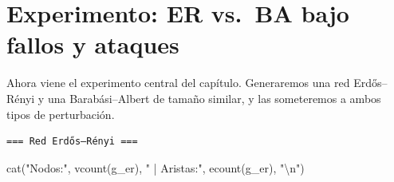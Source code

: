 \documentclass[
  letterpaper,
  DIV=11,
  numbers=noendperiod]{scrreprt}
\newenvironment{Shaded}{\begin{snugshade}}{\end{snugshade}}
\newcommand{\AttributeTok}[1]{\textcolor[rgb]{0.40,0.45,0.13}{#1}}
\newcommand{\CommentTok}[1]{\textcolor[rgb]{0.37,0.37,0.37}{#1}}
\newcommand{\ConstantTok}[1]{\textcolor[rgb]{0.56,0.35,0.01}{#1}}
\newcommand{\DecValTok}[1]{\textcolor[rgb]{0.68,0.00,0.00}{#1}}
\newcommand{\FunctionTok}[1]{\textcolor[rgb]{0.28,0.35,0.67}{#1}}
\newcommand{\NormalTok}[1]{\textcolor[rgb]{0.00,0.23,0.31}{#1}}
\newcommand{\OtherTok}[1]{\textcolor[rgb]{0.00,0.23,0.31}{#1}}
\newcommand{\SpecialCharTok}[1]{\textcolor[rgb]{0.37,0.37,0.37}{#1}}
\newcommand{\StringTok}[1]{\textcolor[rgb]{0.13,0.47,0.30}{#1}}
\begin{document}
\section{Experimento: ER vs.~BA bajo fallos y
ataques}\label{experimento-er-vs.-ba-bajo-fallos-y-ataques}

Ahora viene el experimento central del capítulo. Generaremos una red
Erdős--Rényi y una Barabási--Albert de tamaño similar, y las someteremos
a ambos tipos de perturbación.

\begin{Shaded}
\end{Shaded}

\begin{verbatim}
=== Red Erdős–Rényi ===
\end{verbatim}

\begin{Shaded}
\begin{Highlighting}[]
\FunctionTok{cat}\NormalTok{(}\StringTok{"Nodos:"}\NormalTok{, }\FunctionTok{vcount}\NormalTok{(g\_er), }\StringTok{" | Aristas:"}\NormalTok{, }\FunctionTok{ecount}\NormalTok{(g\_er), }\StringTok{"}\SpecialCharTok{\textbackslash{}n}\StringTok{"}\NormalTok{)}
\end{Highlighting}
\end{Shaded}
\end{document}
